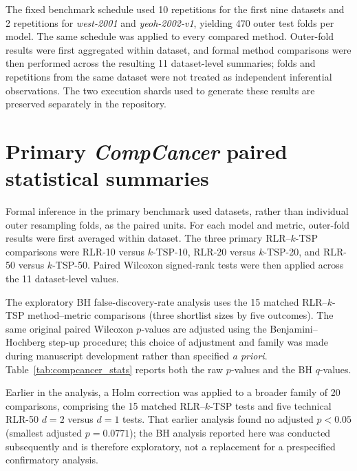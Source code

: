 \documentclass[11pt, a4paper]{article}
\begin{document}
The fixed benchmark schedule used 10 repetitions for the first nine datasets and 2 repetitions for \emph{west-2001} and \emph{yeoh-2002-v1}, yielding 470 outer test folds per model. The same schedule was applied to every compared method. Outer-fold results were first aggregated within dataset, and formal method comparisons were then performed across the resulting 11 dataset-level summaries; folds and repetitions from the same dataset were not treated as independent inferential observations. The two execution shards used to generate these results are preserved separately in the repository.

\section{Primary \emph{CompCancer} paired statistical summaries}

Formal inference in the primary benchmark used datasets, rather than individual outer resampling folds, as the paired units. For each model and metric, outer-fold results were first averaged within dataset. The three primary RLR--$k$-TSP comparisons were RLR-10 versus $k$-TSP-10, RLR-20 versus $k$-TSP-20, and RLR-50 versus $k$-TSP-50. Paired Wilcoxon signed-rank tests were then applied across the 11 dataset-level values.

The exploratory BH false-discovery-rate analysis uses the 15 matched RLR--$k$-TSP method--metric comparisons (three shortlist sizes by five outcomes). The same original paired Wilcoxon $p$-values are adjusted using the Benjamini--Hochberg step-up procedure; this choice of adjustment and family was made during manuscript development rather than specified \emph{a priori}. Table~\ref{tab:compcancer_stats} reports both the raw $p$-values and the BH $q$-values.

Earlier in the analysis, a Holm correction was applied to a broader family of 20 comparisons, comprising the 15 matched RLR--$k$-TSP tests and five technical RLR-50 $d=2$ versus $d=1$ tests. That earlier analysis found no adjusted $p<0.05$ (smallest adjusted $p=0.0771$); the BH analysis reported here was conducted subsequently and is therefore exploratory, not a replacement for a prespecified confirmatory analysis.
\end{document}
